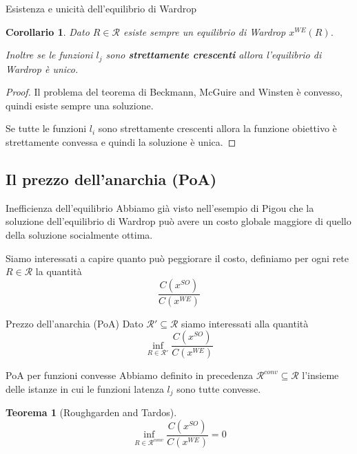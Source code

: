 \documentclass{beamer}
\newcounter{counter1}
\theoremstyle{plain}
\newtheorem{myteo}[counter1]{Teorema}
\newtheorem{mycor}[counter1]{Corollario}
\theoremstyle{definition}
\theoremstyle{remark}
\newcommand{\pa}[1]{\left(#1\right)}
\begin{document}
\begin{frame}{Esistenza e unicità dell'equilibrio di Wardrop}
  \begin{mycor}
    Dato $R\in \mathcal{R}$ esiste sempre un equilibrio di Wardrop
    $x^{WE}(R)$.

    Inoltre se le funzioni $l_j$ sono \textbf{strettamente crescenti}
    allora l'equilibrio di Wardrop è unico.
  \end{mycor}
  \begin{proof}
    Il problema del teorema di Beckmann, McGuire and Winsten è
    convesso, quindi esiste sempre una soluzione.

    Se tutte le funzioni $l_i$ sono strettamente crescenti allora la
    funzione obiettivo è strettamente convessa e quindi la soluzione è
    unica.
  \end{proof}
\end{frame}

\subsection{Il prezzo dell'anarchia (PoA)}

\begin{frame}{Inefficienza dell'equilibrio}
  Abbiamo già visto nell'esempio di Pigou che la soluzione
  dell'equilibrio di Wardrop può avere un costo globale maggiore di
  quello della soluzione socialmente ottima.

  Siamo interessati a capire quanto può peggiorare il costo, definiamo
  per ogni rete $R \in \mathcal{R}$ la quantità
  \[ \frac{C\pa{ x^{SO}}}{C\pa{ x^{WE}}} \]
  \begin{block}{Prezzo dell'anarchia (PoA)}
    Dato $\mathcal{R}' \subseteq \mathcal{R}$ siamo interessati alla
    quantità
    \[ \inf _{R\in \mathcal{R}'} \frac{C\pa{ x^{SO}}}{C\pa{
          x^{WE}}} \]
  \end{block}
\end{frame}

\begin{frame}{PoA per funzioni convesse}
  Abbiamo definito in precedenza $\mathcal{R}^{conv} \subseteq
  \mathcal{R}$ l'insieme delle istanze in cui le funzioni latenza
  $l_j$ sono tutte convesse.
  \begin{myteo}[Roughgarden and Tardos]
    \[ \inf _{R\in \mathcal{R}^{conv}} \frac{C\pa{ x^{SO}}}{C\pa{
          x^{WE}}} = 0 \]
  \end{myteo}
\end{frame}
\end{document}
